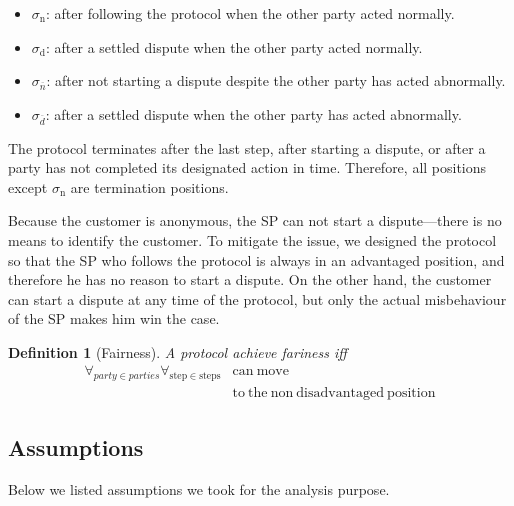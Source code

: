 \documentclass{ieeeaccess}
\newtheorem{definition}{Definition}
\begin{document}
\begin{itemize}

\item
  $\sigma_\mathrm{n}$: after following the protocol when the other party acted normally.
\item
  $\sigma_\mathrm{d}$: after a settled dispute when the other party acted normally.
\item
  $\sigma_\overline{n}$: after not starting a dispute despite the other party has acted abnormally.
\item
  $\sigma_\overline{d}$: after a settled dispute when the other party has acted abnormally.
\end{itemize}

The protocol terminates after the last step, after starting a dispute, or after a party has not completed its designated action in time. Therefore, all positions except $\sigma_\mathrm{n}$ are termination positions.

Because the customer is anonymous, the SP can not start a dispute—there is no means to identify the customer. To mitigate the issue, we designed the protocol so that the SP who follows the protocol is always in an advantaged position, and therefore he has no reason to start a dispute. On the other hand, the customer can start a dispute at any time of the protocol, but only the actual misbehaviour of the SP makes him win the case.

\begin{definition}[Fairness] \label{fairness}
A protocol achieve fariness iff 
\begin{equation*}
\begin{split}
\forall_{party \in parties}\forall_{\mathrm{step} \in \mathrm{steps}} &\mathrm{can\ move}\\
&\mathrm{to\ the\ non\ disadvantaged\ position} 
\end{split}
\end{equation*}

\end{definition}


\subsection{Assumptions}\label{assumptions}

Below  we listed
assumptions we took
for the analysis purpose.  
\end{document}
